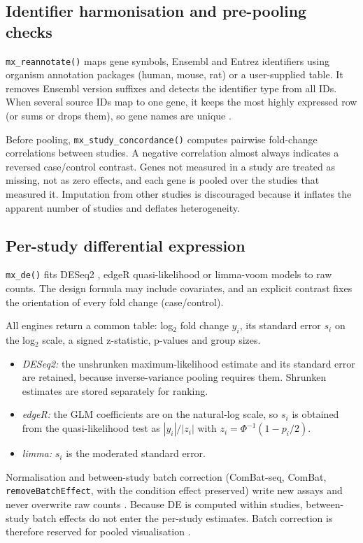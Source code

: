 \documentclass[11pt,a4paper]{article}
\begin{document}
\subsection{Identifier harmonisation and pre-pooling checks}
\texttt{mx\_reannotate()} maps gene symbols, Ensembl and Entrez identifiers using organism annotation packages (human, mouse, rat) or a user-supplied table. It removes Ensembl version suffixes and detects the identifier type from all IDs. When several source IDs map to one gene, it keeps the most highly expressed row (or sums or drops them), so gene names are unique \cite{miller2011collapserows}.

Before pooling, \texttt{mx\_study\_concordance()} computes pairwise fold-change correlations between studies. A negative correlation almost always indicates a reversed case/control contrast. Genes not measured in a study are treated as missing, not as zero effects, and each gene is pooled over the studies that measured it. Imputation from other studies is discouraged because it inflates the apparent number of studies and deflates heterogeneity.

\subsection{Per-study differential expression}
\texttt{mx\_de()} fits DESeq2 \cite{love2014deseq2}, edgeR quasi-likelihood \cite{robinson2010edger, chen2016edgerql} or limma-voom \cite{law2014voom, ritchie2015limma} models to raw counts. The design formula may include covariates, and an explicit contrast fixes the orientation of every fold change (case/control).

All engines return a common table: log$_2$ fold change $y_i$, its standard error $s_i$ on the log$_2$ scale, a signed z-statistic, p-values and group sizes.
\begin{itemize}[noitemsep,topsep=2pt]
    \item \emph{DESeq2:} the unshrunken maximum-likelihood estimate and its standard error are retained, because inverse-variance pooling requires them. Shrunken estimates \cite{zhu2019apeglm} are stored separately for ranking.
    \item \emph{edgeR:} the GLM coefficients are on the natural-log scale, so $s_i$ is obtained from the quasi-likelihood test as $|y_i|/|z_i|$ with $z_i = \Phi^{-1}(1-p_i/2)$.
    \item \emph{limma:} $s_i$ is the moderated standard error.
\end{itemize}
Normalisation and between-study batch correction (ComBat-seq, ComBat, \texttt{removeBatchEffect}, with the condition effect preserved) write new assays and never overwrite raw counts \cite{zhang2020combatseq}. Because DE is computed within studies, between-study batch effects do not enter the per-study estimates. Batch correction is therefore reserved for pooled visualisation \cite{nygaard2016batch}.
\end{document}
